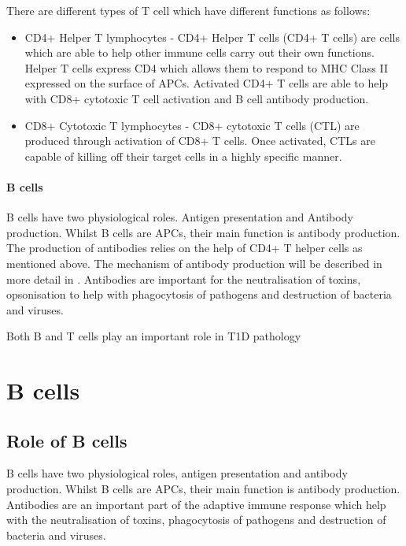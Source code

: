 There are different types of T cell which have different functions as follows:
\begin{itemize}
\item CD4+ Helper T lymphocytes - CD4+ Helper T cells (CD4+ T cells) are cells which are able to help other immune cells carry out their own functions. 
Helper T cells express CD4 which allows them to respond to MHC Class II expressed on the surface of APCs. 
Activated CD4+ T cells are able to help with CD8+ cytotoxic T cell activation and B cell antibody production.
\item CD8+ Cytotoxic T lymphocytes - CD8+ cytotoxic T cells (CTL) are produced through activation of CD8+ T cells.
Once activated, CTLs are capable of killing off their target cells in a highly specific manner.
\end{itemize}

\paragraph{B cells}
B cells have two physiological roles.
Antigen presentation and Antibody production.
Whilst B cells are APCs, their main function is antibody production.
The production of antibodies relies on the help of CD4+ T helper cells as mentioned above.
The mechanism of antibody production will be described in more detail in .
Antibodies are important for the neutralisation of toxins, opsonisation to help with phagocytosis of pathogens and destruction of bacteria and viruses.

Both B and T cells play an important role in T1D pathology




\section{B cells}
\subsection{Role of B cells}
B cells have two physiological roles, antigen presentation and antibody production.
Whilst B cells are APCs, their main function is antibody production.
Antibodies are an important part of the adaptive immune response which help with the neutralisation of toxins, phagocytosis of pathogens and destruction of bacteria and viruses.

